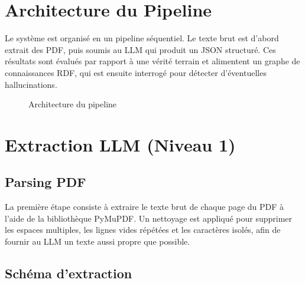 \documentclass[12pt,a4paper]{article}
\begin{document}
\section{Architecture du Pipeline}

Le syst\`eme est organis\'e en un pipeline s\'equentiel. Le texte brut est d'abord extrait des PDF, puis soumis au LLM qui produit un JSON structur\'e. Ces r\'esultats sont \'evalu\'es par rapport \`a une v\'erit\'e terrain et alimentent un graphe de connaissances RDF, qui est ensuite interrog\'e pour d\'etecter d'\'eventuelles hallucinations.

\begin{figure}[H]
\centering
{}
\caption{Architecture du pipeline}
\label{fig:arch}
\end{figure}

\section{Extraction LLM (Niveau 1)}

\subsection{Parsing PDF}

La premi\`ere \'etape consiste \`a extraire le texte brut de chaque page du PDF \`a l'aide de la biblioth\`eque PyMuPDF. Un nettoyage est appliqu\'e pour supprimer les espaces multiples, les lignes vides r\'ep\'et\'ees et les caract\`eres isol\'es, afin de fournir au LLM un texte aussi propre que possible.

\subsection{Sch\'ema d'extraction}
\end{document}
